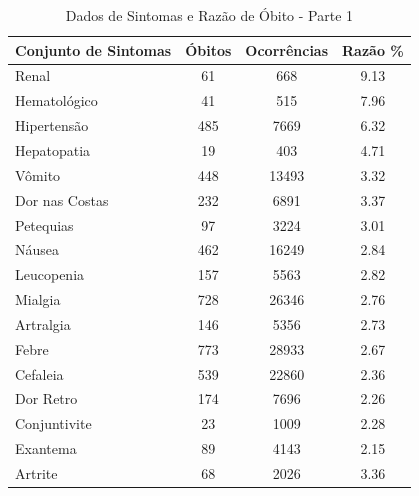 \documentclass[a4paper, 12pt, twoside]{article}
\begin{document}
\begin{table}[H]
    \centering
    \caption{Dados de Sintomas e Razão de Óbito - Parte 1}
    \begin{tabular}{@{}lccc@{}}
        \toprule
        \textbf{Conjunto de Sintomas} & \textbf{Óbitos} & \textbf{Ocorrências} & \textbf{Razão \%} \\ 
        \midrule
        Renal & 61 & 668 & 9.13 \\
        Hematológico & 41 & 515 & 7.96 \\
        Hipertensão & 485 & 7669 & 6.32 \\
        Hepatopatia & 19 & 403 & 4.71 \\
        Vômito & 448 & 13493 & 3.32 \\
        Dor nas Costas & 232 & 6891 & 3.37 \\
        Petequias & 97 & 3224 & 3.01 \\
        Náusea & 462 & 16249 & 2.84 \\
        Leucopenia & 157 & 5563 & 2.82 \\
        Mialgia & 728 & 26346 & 2.76 \\
        Artralgia & 146 & 5356 & 2.73 \\
        Febre & 773 & 28933 & 2.67 \\
        Cefaleia & 539 & 22860 & 2.36 \\
        Dor Retro & 174 & 7696 & 2.26 \\
        Conjuntivite & 23 & 1009 & 2.28 \\
        Exantema & 89 & 4143 & 2.15 \\
        Artrite & 68 & 2026 & 3.36 \\ 
        \bottomrule
    \end{tabular}
    \label{tab:symptom_data_1}
\end{table}
\end{document}
